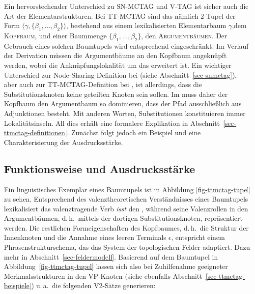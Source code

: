 Ein hervorstechender Unterschied zu SN-MCTAG und V-TAG ist sicher auch die Art der Elementarstrukturen. Bei TT-MCTAG sind das nämlich 2-Tupel der Form $\langle \gamma, \{\beta_1,\ldots,\beta_2\}\rangle$, bestehend aus einem lexikalisierten Elementarbaum $\gamma$,\linebreak dem \textsc{Kopfbaum}, und einer Baummenge $\{\beta_1,\ldots,\beta_2\}$, den \textsc{Argumentbäumen}. Der Gebrauch eines solchen Baumtupels wird entsprechend eingeschränkt: Im Verlauf der Derivation müssen die Argumentbäume an den Kopfbaum angeknüpft werden, wobei die Anknüpfungslokalität um das  erweitert ist. Ein wichtiger Unterschied zur Node-Sharing-Definition bei \cite{Kallmeyer:05} (siehe Abschnitt~\ref{sec-snmctag}), aber auch zur TT-MCTAG-Definition bei \cite{Kallmeyer:09}, ist allerdings, dass die Substitutionsknoten keine geteilten Knoten sein sollen. Im  muss daher der Kopfbaum den Argumentbaum so dominieren, dass der Pfad ausschlie\ss lich aus Adjunktionen besteht. Mit anderen Worten, Substitutionen konstituieren immer Lokalitätsinseln. All dies erhält eine formalere Explikation in Abschnitt~\ref{sec-ttmctag-definitionen}. Zunächst folgt jedoch ein Beispiel und eine Charakterisierung der Ausdrucksstärke.  

\subsection{Funktionsweise und Ausdrucksstärke} \label{sec-ttmctag-funktionausdruck}

Ein linguistisches Exemplar eines Baumtupels ist in Abbildung \ref{fig-ttmctag-tupel} zu sehen. Entsprechend des valenztheoretischen Verständnisses eines Baumtupels lexikalisiert das valenztragende Verb {\it isst} den , während seine Valenzrollen in den Argumentbäumen, d.\,h.\ mittels der dortigen Substitutionsknoten, repräsentiert werden. Die restlichen Formeigenschaften des Kopfbaumes, d.\,h.\ die Struktur der Innenknoten und die Annahme eines leeren Terminals $\epsilon$,  entspricht einem Phrasenstrukturschema, das das System der topologischen Felder adaptiert. Dazu mehr in Abschnitt~\ref{sec-feldermodell}. Basierend auf dem Baumtupel in Abbildung~\ref{fig-ttmctag-tupel} lassen sich also bei Zuhilfenahme geeigneter Merkmalsstrukturen in den VP-Knoten (siehe ebenfalls Abschnitt~\ref{sec-ttmctag-beispiele}) u.\,a.\ die folgenden V2-Sätze generieren:  

